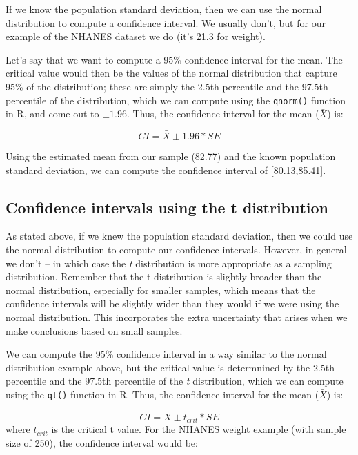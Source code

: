 \documentclass[]{book}
\theoremstyle{definition}
\theoremstyle{definition}
\theoremstyle{definition}
\theoremstyle{remark}
\begin{document}
If we know the population standard deviation, then we can use the normal
distribution to compute a confidence interval. We usually don't, but for
our example of the NHANES dataset we do (it's 21.3 for weight).

Let's say that we want to compute a 95\% confidence interval for the
mean. The critical value would then be the values of the normal
distribution that capture 95\% of the distribution; these are simply the
2.5th percentile and the 97.5th percentile of the distribution, which we
can compute using the \texttt{qnorm()} function in R, and come out to
\(\pm 1.96\). Thus, the confidence interval for the mean (\(\bar{X}\))
is:

\[
CI = \bar{X} \pm 1.96*SE
\]

Using the estimated mean from our sample (82.77) and the known
population standard deviation, we can compute the confidence interval of
{[}80.13,85.41{]}.

\subsection{Confidence intervals using the t
distribution}\label{confidence-intervals-using-the-t-distribution}

As stated above, if we knew the population standard deviation, then we
could use the normal distribution to compute our confidence intervals.
However, in general we don't -- in which case the \emph{t} distribution
is more appropriate as a sampling distribution. Remember that the t
distribution is slightly broader than the normal distribution,
especially for smaller samples, which means that the confidence
intervals will be slightly wider than they would if we were using the
normal distribution. This incorporates the extra uncertainty that arises
when we make conclusions based on small samples.

We can compute the 95\% confidence interval in a way similar to the
normal distribution example above, but the critical value is determnined
by the 2.5th percentile and the 97.5th percentile of the \emph{t}
distribution, which we can compute using the \texttt{qt()} function in
R. Thus, the confidence interval for the mean (\(\bar{X}\)) is:

\[
CI = \bar{X} \pm t_{crit}*SE
\] where \(t_{crit}\) is the critical t value. For the NHANES weight
example (with sample size of 250), the confidence interval would be:
\end{document}

